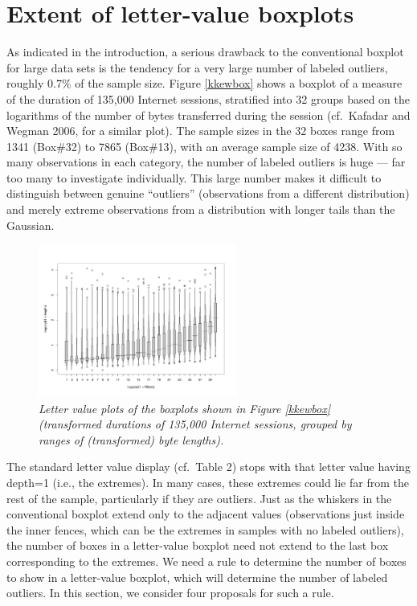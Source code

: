 \documentclass[oneside]{article}
\begin{document}
\section{Extent of letter-value boxplots}

As indicated in the introduction, a serious
drawback to the conventional boxplot for large
data sets is the tendency for a very large number
of labeled outliers, roughly 0.7\% of the sample size.  
Figure \ref{kkewbox} shows a boxplot of a measure of the 
duration of 135,000 Internet sessions, stratified
into 32 groups based on the logarithms of
the number of bytes transferred during the
session (cf.~Kafadar and Wegman 2006, for a similar plot).
The sample sizes in the 32 boxes range from 1341 (Box\#32)
to 7865 (Box\#13), with an average sample size of 4238.
With so many observations in each category,
the number of labeled outliers is huge --- far too 
many to investigate individually.  This large number
makes it difficult to distinguish between genuine
``outliers'' (observations from a different distribution)
and merely extreme observations from a distribution with
longer tails than the Gaussian.

\begin{figure}[htbp]
  \begin{center}
\includegraphics[width=6.5cm,angle=270]{lvbox2}
\caption{\it \label{kkewlv} Letter value plots of the boxplots
shown in Figure \ref{kkewbox} (transformed durations of 135,000
Internet sessions, grouped by ranges of (transformed) byte lengths).}
  \end{center}
 \end{figure}


The standard letter value display (cf.~Table 2) stops with
that letter value having depth=1 (i.e., the extremes).
In many cases, these extremes could lie far from the
rest of the sample, particularly if they are outliers.
Just as the whiskers in the conventional boxplot 
extend only to the adjacent values (observations just
inside the inner fences, which can be the extremes
in samples with no labeled outliers), the number
of boxes in a letter-value boxplot need not
extend to the last box corresponding to the extremes.
We need a rule to determine the number of boxes to
show in a letter-value boxplot, which will determine
the number of labeled outliers.
In this section, we consider four proposals for
such a rule.
\end{document}
